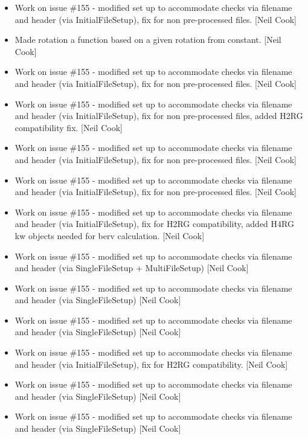 \documentclass[a4paper,10pt,english]{report}
\begin{document}
\begin{itemize}
\item {} 
Work on issue \#155 - modified set up to accommodate checks via
filename and header (via InitialFileSetup), fix for non pre-processed
files. {[}Neil Cook{]}

\item {} 
Made rotation a function based on a given rotation from constant.
{[}Neil Cook{]}

\item {} 
Work on issue \#155 - modified set up to accommodate checks via
filename and header (via InitialFileSetup), fix for non pre-processed
files. {[}Neil Cook{]}

\item {} 
Work on issue \#155 - modified set up to accommodate checks via
filename and header (via InitialFileSetup), fix for non pre-processed
files, added H2RG compatibility fix. {[}Neil Cook{]}

\item {} 
Work on issue \#155 - modified set up to accommodate checks via
filename and header (via InitialFileSetup), fix for non pre-processed
files. {[}Neil Cook{]}

\item {} 
Work on issue \#155 - modified set up to accommodate checks via
filename and header (via InitialFileSetup), fix for non pre-processed
files. {[}Neil Cook{]}

\item {} 
Work on issue \#155 - modified set up to accommodate checks via
filename and header (via InitialFileSetup), fix for H2RG
compatibility, added H4RG kw objects needed for berv calculation.
{[}Neil Cook{]}

\item {} 
Work on issue \#155 - modified set up to accommodate checks via
filename and header (via SingleFileSetup + MultiFileSetup) {[}Neil Cook{]}

\item {} 
Work on issue \#155 - modified set up to accommodate checks via
filename and header (via SingleFileSetup) {[}Neil Cook{]}

\item {} 
Work on issue \#155 - modified set up to accommodate checks via
filename and header (via SingleFileSetup) {[}Neil Cook{]}

\item {} 
Work on issue \#155 - modified set up to accommodate checks via
filename and header (via InitialFileSetup), fix for H2RG
compatibility. {[}Neil Cook{]}

\item {} 
Work on issue \#155 - modified set up to accommodate checks via
filename and header (via SingleFileSetup) {[}Neil Cook{]}

\item {} 
Work on issue \#155 - modified set up to accommodate checks via
filename and header (via SingleFileSetup) {[}Neil Cook{]}

\end{itemize}
\end{document}
